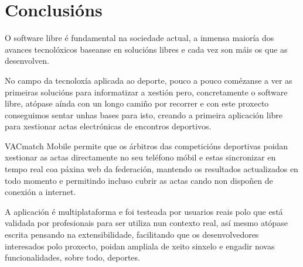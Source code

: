 \clearpage

\section{Conclusións}
O software libre é fundamental na sociedade actual, a inmensa maioría dos 
avances tecnolóxicos baseanse en solucións libres e cada vez son máis os que  
as desenvolven.

  No campo da tecnoloxía aplicada ao deporte, pouco a pouco comézanse a ver as 
primeiras solucións para informatizar a xestión pero, concretamente o 
software libre, atópase aínda con un longo camiño por recorrer e con este 
proxecto conseguimos sentar unhas bases para isto, creando a primeira 
aplicación libre para xestionar actas electrónicas de encontros deportivos.

  VACmatch Mobile permite que os árbitros das competicións deportivas poidan 
xestionar as actas directamente no seu teléfono móbil e estas 
sincronizar en tempo real coa páxina web da federación, mantendo os 
resultados actualizados en todo momento e permitindo incluso cubrir as 
actas cando non dispoñen de conexión a internet.

  A aplicación é multiplataforma e foi testeada por usuarios reais polo que 
está validada por profesionais para ser utiliza nun contexto real, así mesmo 
atópase escrita pensando na extensibilidade, facilitando que os desenvolvedores 
interesados polo proxecto, poidan ampliala de xeito sinxelo e engadir novas 
funcionalidades, sobre todo, deportes.
